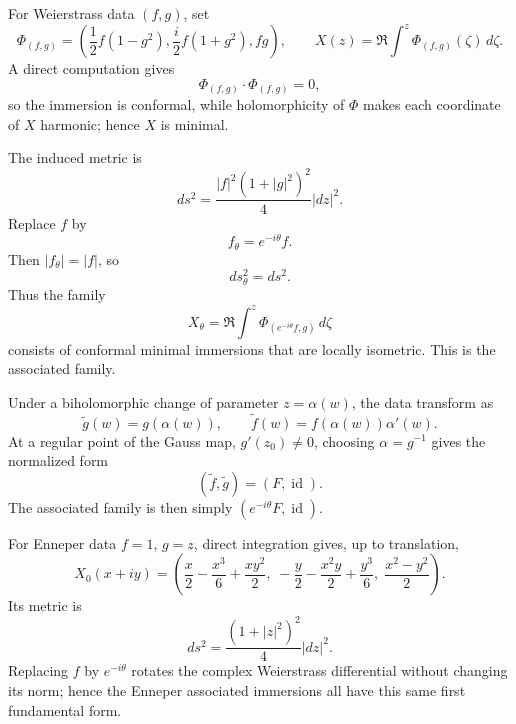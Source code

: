 \begin{solution}
For Weierstrass data \((f,g)\), set
\[
\Phi_{(f,g)}
=
\left(
\frac12 f(1-g^2),
\frac{i}{2}f(1+g^2),
fg
\right),
\qquad
X(z)=\Re\int^z\Phi_{(f,g)}(\zeta)\,d\zeta.
\]
A direct computation gives
\[
\Phi_{(f,g)}\cdot\Phi_{(f,g)}=0,
\]
so the immersion is conformal, while holomorphicity of \(\Phi\) makes each coordinate of \(X\) harmonic; hence \(X\) is minimal.

The induced metric is
\[
ds^2
=
\frac{|f|^2(1+|g|^2)^2}{4}|dz|^2.
\]
Replace \(f\) by
\[
f_\theta=e^{-i\theta}f.
\]
Then \(|f_\theta|=|f|\), so
\[
ds_\theta^2=ds^2.
\]
Thus the family
\[
X_\theta
=
\Re\int^z\Phi_{(e^{-i\theta}f,g)}\,d\zeta
\]
consists of conformal minimal immersions that are locally isometric. This is the associated family.

Under a biholomorphic change of parameter \(z=\alpha(w)\), the data transform as
\[
\widetilde g(w)=g(\alpha(w)),
\qquad
\widetilde f(w)=f(\alpha(w))\alpha'(w).
\]
At a regular point of the Gauss map, \(g'(z_0)\neq0\), choosing \(\alpha=g^{-1}\) gives the normalized form
\[
(\widetilde f,\widetilde g)=(F,\operatorname{id}).
\]
The associated family is then simply \((e^{-i\theta}F,\operatorname{id})\).

For Enneper data $f=1$, $g=z$, direct integration gives, up to translation,
\[
 X_0(x+iy)=\left(\frac{x}{2}-\frac{x^3}{6}+\frac{xy^2}{2},\;
 -\frac{y}{2}-\frac{x^2y}{2}+\frac{y^3}{6},\;
 \frac{x^2-y^2}{2}\right).
\]
Its metric is
\[
 ds^2=\frac{(1+|z|^2)^2}{4}|dz|^2.
\]
Replacing $f$ by $e^{-i\theta}$ rotates the complex Weierstrass differential
without changing its norm; hence the Enneper associated immersions all have
this same first fundamental form.
\end{solution}


